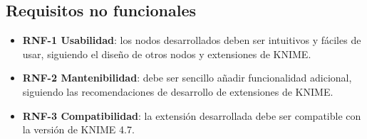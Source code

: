 \subsection{Requisitos no funcionales}
\begin{itemize}
	\item \textbf{RNF-1 Usabilidad}: los nodos desarrollados deben ser intuitivos y fáciles de usar, siguiendo el diseño de otros nodos y extensiones de KNIME.
	\item \textbf{RNF-2 Mantenibilidad}: debe ser sencillo añadir funcionalidad adicional, siguiendo las recomendaciones de desarrollo de extensiones de KNIME.
	\item \textbf{RNF-3 Compatibilidad}: la extensión desarrollada debe ser compatible con la versión de KNIME 4.7.
\end{itemize}